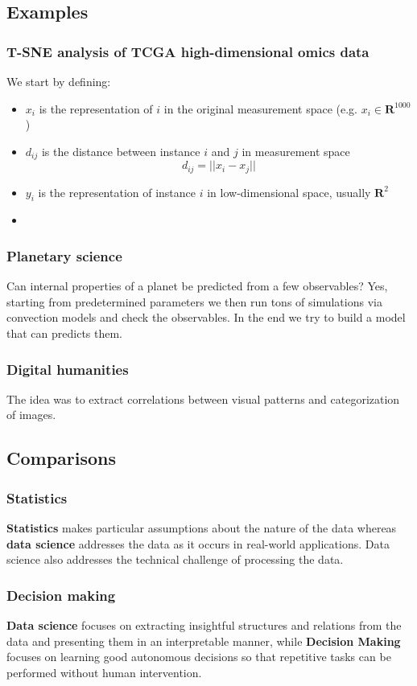 \subsection{Examples}
\subsubsection{T-SNE analysis of TCGA high-dimensional omics data}
We start by defining:
\begin{itemize}
	\item $x_i$ is the representation of $i$ in the original measurement space (e.g. $x_i \in \mathbf{R}^{1000}$)
	\item $d_{ij}$ is the distance between instance $i$ and $j$ in measurement space
	\begin{equation*}
		d_{ij} = \lvert\lvert x_i - x_j \rvert\rvert
	\end{equation*}
	\item $y_i$ is the representation of instance $i$ in low-dimensional space, usually $\mathbf{R}^2$
	\item 
\end{itemize}

\subsubsection{Planetary science}
Can internal properties of a planet be predicted from a few observables? Yes, starting from predetermined parameters we then run tons of simulations via convection models and check the observables. In the end we try to build a model that can predicts them.

 \subsubsection{Digital humanities}
 The idea was to extract correlations between visual patterns and categorization of images.
 
 \subsection{Comparisons}
 \subsubsection{Statistics}
 \textbf{Statistics} makes particular assumptions about the nature of the data whereas \textbf{data science} addresses the data as it occurs in real-world applications. Data science also addresses the technical challenge of processing the data.
 \subsubsection{Decision making}
 \textbf{Data science} focuses on extracting insightful structures and relations from the data and presenting them in an interpretable manner, while \textbf{Decision Making} focuses on learning good autonomous decisions so that repetitive tasks can be performed without human intervention.
 